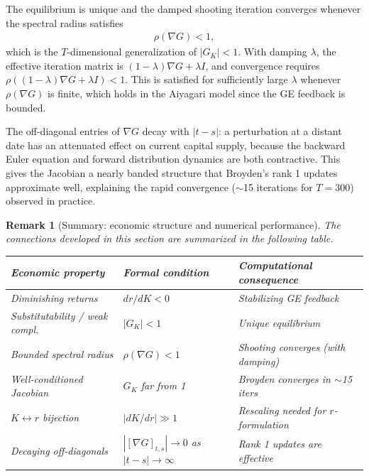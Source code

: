 \documentclass[12pt]{article}
\newtheorem{remark}{Remark}
\begin{document}
The equilibrium is unique and the damped shooting iteration converges whenever the spectral radius satisfies
\begin{align}
    \rho\!\left(\nabla G\right) < 1, \label{eq:spectral_condition}
\end{align}
which is the $T$-dimensional generalization of $|G_K| < 1$. With damping $\lambda$, the effective iteration matrix is $(1-\lambda)\nabla G + \lambda I$, and convergence requires $\rho((1-\lambda)\nabla G + \lambda I) < 1$. This is satisfied for sufficiently large $\lambda$ whenever $\rho(\nabla G)$ is finite, which holds in the Aiyagari model since the GE feedback is bounded.

The off-diagonal entries of $\nabla G$ decay with $|t - s|$: a perturbation at a distant date has an attenuated effect on current capital supply, because the backward Euler equation and forward distribution dynamics are both contractive. This gives the Jacobian a nearly banded structure that Broyden's rank 1 updates approximate well, explaining the rapid convergence ($\sim$15 iterations for $T = 300$) observed in practice.

\begin{remark}[Summary: economic structure and numerical performance]
\label{rem:summary}
The connections developed in this section are summarized in the following table.
\begin{center}
\begin{tabular}{lll}
\toprule
\textbf{Economic property} & \textbf{Formal condition} & \textbf{Computational consequence} \\
\midrule
Diminishing returns & $dr/dK < 0$ & Stabilizing GE feedback \\
Substitutability / weak compl. & $|G_K| < 1$ & Unique equilibrium \\
Bounded spectral radius & $\rho(\nabla G) < 1$ & Shooting converges (with damping) \\
Well-conditioned Jacobian & $G_K$ far from 1 & Broyden converges in $\sim$15 iters \\
$K \leftrightarrow r$ bijection & $|dK/dr| \gg 1$ & Rescaling needed for $r$-formulation \\
Decaying off-diagonals & $|[\nabla G]_{t,s}| \to 0$ as $|t-s| \to \infty$ & Rank 1 updates are effective \\
\bottomrule
\end{tabular}
\end{center}
\end{remark}
\end{document}
